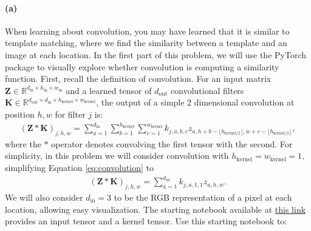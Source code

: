 \documentclass{exam}
\begin{document}
\paragraph{(a)} 
When learning about convolution, you may have learned that it is similar to template matching, where we find the similarity between a template and an image at each location. In the first part of this problem, we will use the PyTorch package to visually explore whether convolution is computing a similarity function. First, recall the definition of convolution. For an input matrix $\mathbf{Z} \in \mathbb{R}^{d_{\text{in}} \times h_{\text{in}} \times w_{\text{in}}}$ and a learned tensor of $d_{\text{out}}$ convolutional filters $\mathbf{K} \in \mathbb{R}^{d_{\text{out}}\times d_{\text{in}} \times h_{\text{kernel}} \times w_{\text{kernel}}}$, the output of a simple 2 dimensional convolution at position $h, w$ for filter $j$ is:
\begin{align}
\label{eq:convolution}
    (\mathbf{Z} * \mathbf{K})_{j, h, w} = \sum_{a=1}^{d_{\text{in}}}
    \sum_{b=1}^{h_{\text{kernel}}}
    \sum_{c=1}^{w_{\text{kernel}}}  k_{j,a,b,c} z_{a, h+b-\lfloor h_{\text{kernel}/2}\rfloor, w+c-\lfloor h_{\text{kernel}/2}\rfloor},
\end{align}
where the $*$ operator denotes convolving the first tensor with the second.
For simplicity, in this problem we will consider convolution with $h_{\text{kernel}} = w_{\text{kernel}} = 1,$ simplifying Equation \ref{eq:convolution} to
\begin{align}
\label{eq:convolution_ez}
    (\mathbf{Z} * \mathbf{K})_{j, h, w} = \sum_{a=1}^{d_{\text{in}}} k_{j,a,1, 1} z_{a, h, w}.
\end{align}
We will also consider $d_{\text{in}} = 3$ to be the RGB representation of a pixel at each location, allowing easy visualization. The starting notebook available at \href{https://colab.research.google.com/drive/15Bz5HiW1T0guSmcl6nLY8NJU9NH9vx7B?usp=sharing}{this link} provides an input tensor and a kernel tensor. Use this starting notebook to:
\end{document}
